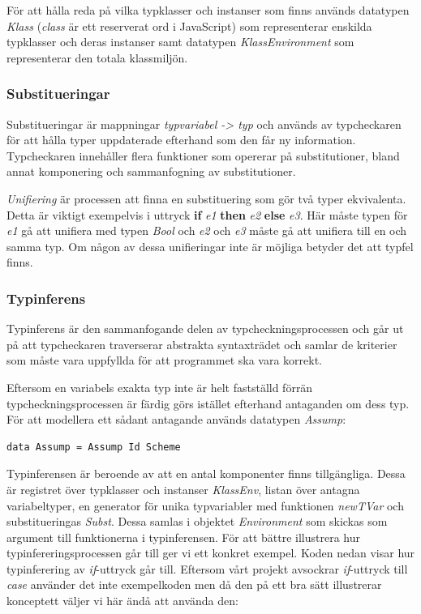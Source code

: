 För att hålla reda på vilka typklasser och instanser som finns används datatypen \emph{Klass} (\emph{class} är ett reserverat ord i JavaScript) som representerar enskilda typklasser och deras instanser samt datatypen \emph{KlassEnvironment} som representerar den totala klassmiljön.


\subsubsection{Substitueringar}
Substitueringar är mappningar \emph{typvariabel -> typ} och används av typcheckaren
för att hålla typer uppdaterade efterhand som den får ny
information. Typcheckaren innehåller flera funktioner som opererar på
substitutioner, bland annat komponering och sammanfogning av
substitutioner.

\emph{Unifiering} är processen att finna en substituering som gör två typer ekvivalenta. Detta är viktigt exempelvis i uttryck {\bf if} \emph{e1} {\bf then} \emph{e2} {\bf else} \emph{e3}. Här måste typen för \emph{e1} gå att unifiera med typen \emph{Bool} och \emph{e2} och \emph{e3} måste gå att unifiera till en och samma typ. Om någon av dessa unifieringar inte är möjliga betyder det att typfel finns.

\subsubsection{Typinferens}
Typinferens är den sammanfogande delen av typcheckningsprocessen och går ut på att typcheckaren traverserar abstrakta syntaxträdet och samlar de kriterier som måste vara uppfyllda för att programmet ska vara korrekt.

Eftersom en variabels exakta typ inte är helt fastställd förrän typcheckningsprocessen är färdig görs istället efterhand antaganden om dess typ. För att modellera ett sådant antagande används datatypen \emph{Assump}:
\begin{lstlisting}
data Assump = Assump Id Scheme
\end{lstlisting}

Typinferensen är beroende av att en antal komponenter finns tillgängliga. Dessa är registret över typklasser och instanser \emph{KlassEnv}, listan över antagna variabeltyper, en generator för unika typvariabler med funktionen \emph{newTVar} och substitueringas \emph{Subst}. Dessa samlas i objektet \emph{Environment} som skickas som argument till funktionerna i typinferensen. 
För att bättre illustrera hur typinfereringsprocessen går till ger vi ett konkret exempel. Koden nedan visar hur typinferering av \emph{if}-uttryck går till. Eftersom vårt projekt avsockrar \emph{if}-uttryck till \emph{case} använder det inte exempelkoden men då den på ett bra sätt illustrerar konceptett väljer vi här ändå att använda den:

